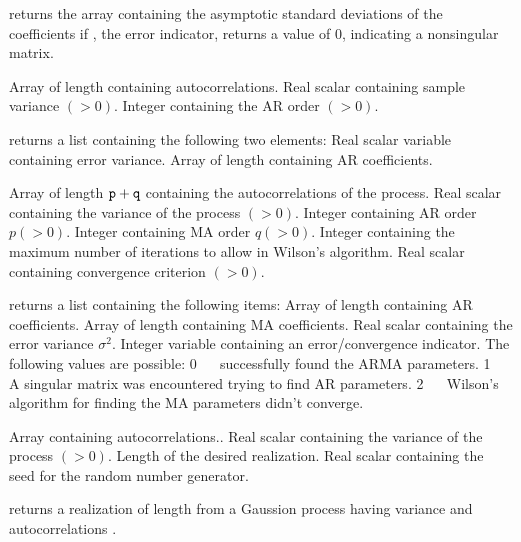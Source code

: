 \Sval
\Sitem{ }  returns the array containing the 
asymptotic standard deviations of the coefficients if {}, the 
error indicator, returns a value of 0, indicating a nonsingular matrix.
%


\Sarg
{} Array of length {} containing autocorrelations.
 Real scalar containing sample variance $(>0)$.
 Integer containing the AR order $(>0)$.

\Sval 
\Sitem{ } returns a list containing the following 
two elements:
 Real scalar variable containing error variance.
 Array of length {} containing AR coefficients.
%
%


\Sarg
{} Array of length ${\tt{p}}+{\tt{q}}$ containing the 
autocorrelations of the process.
 Real scalar containing the variance of the process $(>0)$.
 Integer containing AR order $p(>0)$.
 Integer containing MA order $q(>0)$.
 Integer containing the maximum number of iterations to allow
in Wilson's algorithm.
 Real scalar containing convergence criterion $(>0)$.

\Sval
\Sitem{ }  returns a list containing the following items:
 Array of length {} containing AR coefficients.
 Array of length {} containing MA coefficients.
 Real scalar containing the error variance $\sigma^2$.
 Integer variable containing an error/convergence indicator.  The
following values are possible:
\Sitem{ } 0 ~~ {} successfully found the ARMA parameters.
\Sitem{ } 1 ~~ A singular matrix was encountered trying to find AR 
parameters.
\Sitem{ } 2 ~~ Wilson's algorithm for finding the MA parameters didn't 
converge.
%
%


\Sarg
{} Array containing autocorrelations..
 Real scalar containing the variance of the process $(>0)$.
 Length of the desired realization.
 Real scalar containing the seed for the random number generator.

\Sval
\Sitem{ }  returns a realization of length {} from a
Gaussion process having variance {} and autocorrelations {}.
%
%

